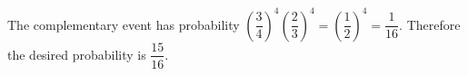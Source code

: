 The complementary event has probability $\left(\dfrac{3}{4}\right)^4\left(\dfrac{2}{3}\right)^4=\left(\dfrac{1}{2}\right)^4=\dfrac{1}{16}$. Therefore the desired probability is $\boxed{\dfrac{15}{16}}$.
